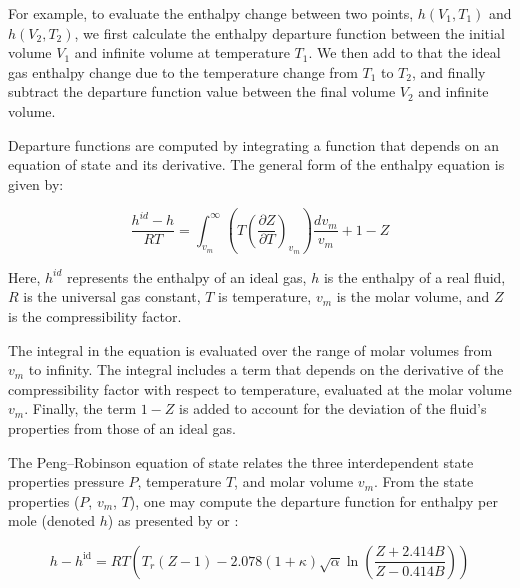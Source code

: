 \documentclass[../Article_Model_Parameters.tex]{subfiles}
\begin{document}
	For example, to evaluate the enthalpy change between two points, $h(V_1,T_1)$ and $h(V_2,T_2)$, we first calculate the enthalpy departure function between the initial volume $V_1$ and infinite volume at temperature $T_1$. We then add to that the ideal gas enthalpy change due to the temperature change from $T_1$ to $T_2$, and finally subtract the departure function value between the final volume $V_2$ and infinite volume.
	
	Departure functions are computed by integrating a function that depends on an equation of state and its derivative. The general form of the enthalpy equation is given by:
	
	{\footnotesize
		\begin{equation}
			\frac{h^{id}-h}{RT} =\int_{v_m}^{\infty }\left(T\left({\frac{\partial Z}{\partial T}}\right)_{v_m}\right){\frac{dv_m}{v_m}} + 1-Z
		\end{equation}
	}
	
	Here, $h^{id}$ represents the enthalpy of an ideal gas, $h$ is the enthalpy of a real fluid, $R$ is the universal gas constant, $T$ is temperature, $v_m$ is the molar volume, and $Z$ is the compressibility factor.
	
	The integral in the equation is evaluated over the range of molar volumes from $v_m$ to infinity. The integral includes a term that depends on the derivative of the compressibility factor with respect to temperature, evaluated at the molar volume $v_m$. Finally, the term $1-Z$ is added to account for the deviation of the fluid's properties from those of an ideal gas.

	The Peng–Robinson equation of state relates the three interdependent state properties pressure $P$, temperature $T$, and molar volume $v_m$. From the state properties ($P$, $v_m$, $T$), one may compute the departure function for enthalpy per mole (denoted $h$) as presented by \citet{Gmehling2019} or \citet{Elliott2011}:
	
	{\footnotesize
		\begin{equation}
			h-h^{\mathrm {id} }=RT\left(T_{r}(Z-1)-2.078(1+\kappa ){\sqrt {\alpha }}\ln \left({\frac {Z+2.414B}{Z-0.414B}}\right)\right)
		\end{equation}
	}
	
	
\end{document}
